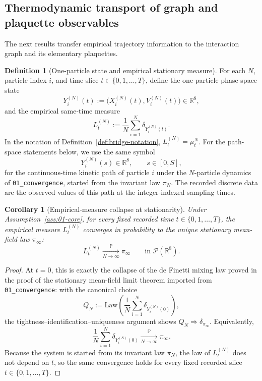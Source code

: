 \documentclass[11pt]{article}
\newtheorem{corollary}[theorem]{Corollary}
\theoremstyle{definition}
\newtheorem{definition}[theorem]{Definition}
\theoremstyle{remark}
\newcommand{\R}{\mathbb R}
\newcommand{\Tset}{\{0,1,\dots,T\}}
\newcommand{\Law}{\mathrm{Law}}
\newcommand{\mcP}{\mathcal P}
\begin{document}
\subsection{Thermodynamic transport of graph and plaquette observables}

The next results transfer empirical trajectory information to the interaction
graph and its elementary plaquettes.

\begin{definition}[One-particle state and empirical stationary measure]
\label{def:one-particle-state}
For each \(N\), particle index \(i\), and time slice \(t\in\Tset\), define the
one-particle phase-space state
\[
Y_i^{(N)}(t):=\bigl(X_i^{(N)}(t),V_i^{(N)}(t)\bigr)\in\R^8,
\]
and the empirical same-time measure
\[
L_t^{(N)}
:=
\frac1N\sum_{i=1}^N \delta_{Y_i^{(N)}(t)}.
\]
In the notation of Definition~\ref{def:bridge-notation}, \(L_t^{(N)}=\mu_t^N\).
For the path-space statements below, we use the same symbol
\[
Y_i^{(N)}(s)\in\R^8,\qquad s\in[0,S],
\]
for the continuous-time kinetic path of particle \(i\) under the
\(N\)-particle dynamics of \texttt{01\_convergence}, started from the invariant
law \(\pi_N\).
The recorded discrete data are the observed values of this path at the
integer-indexed sampling times.
\end{definition}

\begin{corollary}[Empirical-measure collapse at stationarity]
\label{cor:stationary-empirical-collapse}
Under Assumption~\ref{ass:01-core}, for every fixed recorded time \(t\in\Tset\),
the empirical measure \(L_t^{(N)}\) converges in probability to the unique
stationary mean-field law \(\pi_\infty\):
\[
L_t^{(N)}
\xrightarrow[N\to\infty]{\mathbb P}
\pi_\infty
\qquad\text{in }\mcP(\R^8).
\]
\end{corollary}

\begin{proof}
At \(t=0\), this is exactly the collapse of the de Finetti mixing law proved in
the proof of the stationary mean-field limit theorem imported from
\texttt{01\_convergence}: with the canonical choice
\[
Q_N:=\Law\!\left(\frac1N\sum_{i=1}^N\delta_{Y_i^{(N)}(0)}\right),
\]
the tightness--identification--uniqueness argument shows \(Q_N\Rightarrow
\delta_{\pi_\infty}\).
Equivalently,
\[
\frac1N\sum_{i=1}^N\delta_{Y_i^{(N)}(0)}
\xrightarrow[N\to\infty]{\mathbb P}\pi_\infty.
\]
Because the system is started from its invariant law \(\pi_N\), the law of
\(L_t^{(N)}\) does not depend on \(t\), so the same convergence holds for every
fixed recorded slice \(t\in\Tset\).
\end{proof}
\end{document}
